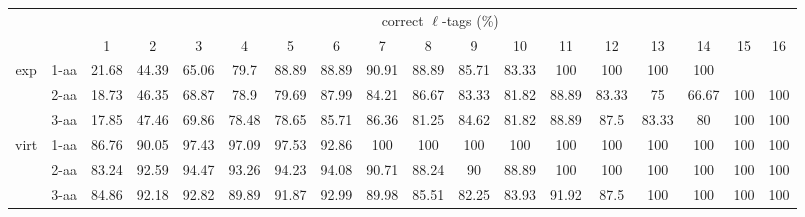 \documentclass{article}[12pt]
\begin{document}
\begin{landscape}
\begin{table}[h]\tiny
\vspace{3mm}
{\centering
\begin{center}
\begin{tabular}{|c|l|c|c|c|c|c|c|c|c|c|c|c|c|c|c|c|c|}
  \hline
  \multicolumn{2}{|c|}{ } & \multicolumn{ 16 }{|c|}{ correct $\ell$-tags (\%)} \\
  \cline{3- 18}
  \multicolumn{2}{|c|}{ }  & 1 & 2 & 3 & 4 & 5 & 6 & 7 & 8 & 9 & 10 & 11 & 12 & 13 & 14 & 15 & 16\\
  \hline
  \multirow{3}{*}{exp}
&  1-aa  & 21.68 & 44.39 & 65.06 & 79.7 & 88.89 & 88.89 & 90.91 & 88.89 & 85.71 & 83.33 & 100 & 100 & 100 & 100 &  & \\
&  2-aa  & 18.73 & 46.35 & 68.87 & 78.9 & 79.69 & 87.99 & 84.21 & 86.67 & 83.33 & 81.82 & 88.89 & 83.33 & 75 & 66.67 & 100 & 100\\
&  3-aa  & 17.85 & 47.46 & 69.86 & 78.48 & 78.65 & 85.71 & 86.36 & 81.25 & 84.62 & 81.82 & 88.89 & 87.5 & 83.33 & 80 & 100 & 100\\
 \hline
  \multirow{3}{*}{virt} 
&  1-aa  & 86.76 & 90.05 & 97.43 & 97.09 & 97.53 & 92.86 & 100 & 100 & 100 & 100 & 100 & 100 & 100 & 100 & 100 & 100\\
&  2-aa  & 83.24 & 92.59 & 94.47 & 93.26 & 94.23 & 94.08 & 90.71 & 88.24 & 90 & 88.89 & 100 & 100 & 100 & 100 & 100 & 100\\
&  3-aa  & 84.86 & 92.18 & 92.82 & 89.89 & 91.87 & 92.99 & 89.98 & 85.51 & 82.25 & 83.93 & 91.92 & 87.5 & 100 & 100 & 100 & 100\\
 \hline
\end{tabular}
\end{center}
\par}
\centering
\vspace{3mm}
\end{table}


\end{landscape}
\end{document}
